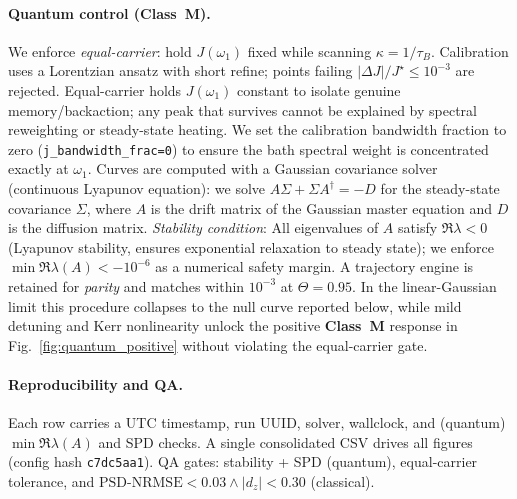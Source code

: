 \documentclass[11pt,letterpaper]{article}
\newcommand{\confighash}{c7dc5aa1}
\DeclareRobustCommand{\classM}{\textbf{Class~M}\xspace}
\DeclareRobustCommand{\GatePSD}{\ensuremath{\text{PSD-NRMSE}<0.03}\xspace}
\DeclareRobustCommand{\GateDZ}{\ensuremath{\lvert d_z\rvert<0.30}\xspace}
\DeclareRobustCommand{\GateEQ}{\ensuremath{\GatePSD \wedge \GateDZ}\xspace}
\begin{document}
\paragraph*{Quantum control (\classM).}
We enforce \emph{equal-carrier}: hold $J(\omega_1)$ fixed while scanning $\kappa=1/\tau_B$. Calibration uses a Lorentzian ansatz with short refine; points failing \textbf{$|\Delta J|/J^\star\le 10^{-3}$} are rejected. Equal-carrier holds $J(\omega_1)$ constant to isolate genuine memory/backaction; any peak that survives cannot be explained by spectral reweighting or steady-state heating. We set the calibration bandwidth fraction to zero (\texttt{j\_bandwidth\_frac=0}) to ensure the bath spectral weight is concentrated exactly at $\omega_1$. Curves are computed with a Gaussian covariance solver (continuous Lyapunov equation): we solve $A\Sigma + \Sigma A^\dagger = -D$ for the steady-state covariance $\Sigma$, where $A$ is the drift matrix of the Gaussian master equation and $D$ is the diffusion matrix. \emph{Stability condition}: All eigenvalues of $A$ satisfy $\Re\lambda < 0$ (Lyapunov stability, ensures exponential relaxation to steady state); we enforce $\min\Re\lambda(A) < -10^{-6}$ as a numerical safety margin. A trajectory engine is retained for \emph{parity} and matches within $10^{-3}$ at $\Theta=0.95$. In the linear-Gaussian limit this procedure collapses to the null curve reported below, while mild detuning and Kerr nonlinearity unlock the positive \classM{} response in Fig.~\ref{fig:quantum_positive} without violating the equal-carrier gate.

\paragraph*{Reproducibility and QA.}
Each row carries a UTC timestamp, run UUID, solver, wallclock, and (quantum) $\min \Re \lambda(A)$ and SPD checks. A single consolidated CSV drives all figures (config hash \texttt{\confighash}). QA gates: stability + SPD (quantum), equal-carrier tolerance, and \GateEQ{} (classical).
\end{document}
